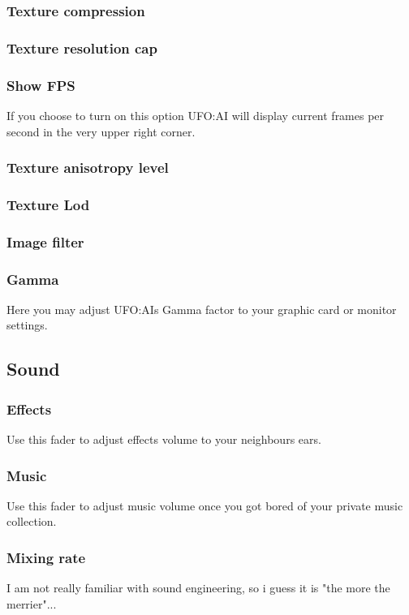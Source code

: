 \subsubsection*{Texture compression}
\subsubsection*{Texture resolution cap}
\subsubsection*{Show FPS}
If you choose to turn on this option UFO:AI will display current frames per second in the very upper right corner.
\subsubsection*{Texture anisotropy level}
\subsubsection*{Texture Lod}
\subsubsection*{Image filter}
\subsubsection*{Gamma}
Here you may adjust UFO:AIs Gamma factor to your graphic card or monitor settings.

\subsection{Sound}
\subsubsection*{Effects}
Use this fader to adjust effects volume to your neighbours ears.
\subsubsection*{Music}
Use this fader to adjust music volume once you got bored of your private music collection.
\subsubsection*{Mixing rate}
I am not really familiar with sound engineering, so i guess it is "the more the merrier"...

